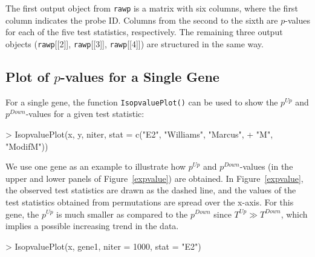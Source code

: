 \documentclass[10pt]{mybook4}
\begin{document}
The first output object from \texttt{rawp} is a matrix with six
columns, where the first column indicates the probe ID. Columns from
the second to the sixth are $p$-values for each of the five test
statistics, respectively. The remaining three output objects
(\texttt{rawp}[[2]], \texttt{rawp}[[3]], \texttt{rawp}[[4]]) are
structured in the same way.


\subsection{Plot of $p$-values for a Single Gene}

For a single gene, the function \texttt{IsopvaluePlot()} can be used
to show the $p^{Up}$ and $p^{Down}$-values for a given test
statistic:

\begin{Schunk}
\begin{Sinput}
> IsopvaluePlot(x, y, niter, stat = c("E2", "Williams", "Marcus", 
+     "M", "ModifM"))
\end{Sinput}
\end{Schunk}


We use one gene as an example to illustrate how $p^{Up}$ and
$p^{Down}$-values (in the upper and lower panels of
Figure~\ref{expvalue}) are obtained. In Figure~\ref{expvalue}, the
observed test statistics are drawn as the dashed line, and the
values of the test statistics obtained from permutations are spread
over the x-axis. For this gene, the $p^{Up}$ is much smaller as
compared to the $p^{Down}$ since $T^{Up} \gg T^{Down}$, which
implies a possible increasing trend in the data.

\begin{Schunk}
\begin{Sinput}
> IsopvaluePlot(x, gene1, niter = 1000, stat = "E2")
\end{Sinput}
\end{Schunk}
\end{document}

